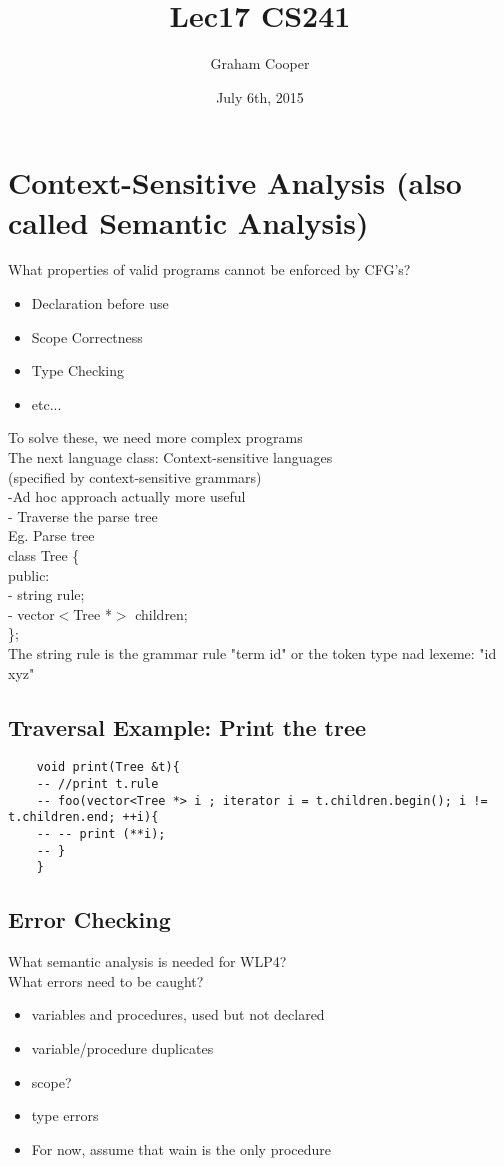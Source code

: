 \documentclass[12pt]{article}
\title{\vspace{-15ex}Lec17 CS241\vspace{-1ex}}
\date{July 6th, 2015}
\author{Graham Cooper}
\begin{document}
	\maketitle
	
	\section*{Context-Sensitive Analysis (also called Semantic Analysis)}
	What properties of valid programs cannot be enforced by CFG's?\\
	\begin{itemize}
		\item Declaration before use
		\item Scope Correctness
		\item Type Checking
		\item etc...
	\end{itemize}
	
	To solve these, we need more complex programs\\
	The next language class: Context-sensitive languages\\
	(specified by context-sensitive grammars)\\
	
	-Ad hoc approach actually more useful\\
	- Traverse the parse tree \\
	
	Eg. Parse tree\\
	class Tree \{\\
	public:\\
	- string rule;\\
	- vector$<$Tree *$>$ children;\\
	\};\\
	The string rule is the grammar rule "term id" or the token type nad lexeme: "id xyz"\\
	
	\subsection*{Traversal Example: Print the tree}
	\begin{verbatim}
	void print(Tree &t){
	-- //print t.rule
	-- foo(vector<Tree *> i ; iterator i = t.children.begin(); i != t.children.end; ++i){
	-- -- print (**i);
	-- }
	}
	\end{verbatim}
	
	\subsection*{Error Checking}
	What semantic analysis is needed for WLP4?\\
	What errors need to be caught?\\
	\begin{itemize}
		\item variables and procedures, used but not declared
		\item variable/procedure duplicates
		\item scope?
		\item type errors
		\item For now, assume that wain is the only procedure
	\end{itemize}
	
\end{document}
